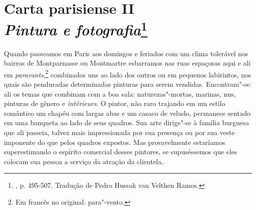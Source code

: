 \chapter{Carta parisiense II\\
\emph{Pintura e fotografia}\footnote[*]{
  , p. 495-507. Tradução de Pedro Hussak van Velthen Ramos.}}


Quando passeamos em Paris aos domingos e feriados com um clima tolerável
nos bairros de Montparnasse ou Montmartre esbarramos nas ruas espaçosas
aqui e ali em \emph{paravants},\footnote{Em francês no original:
 para"-vento. \versal{[N. T.]}} combinados uns ao lado dos outros ou em pequenos
labirintos, nos quais são penduradas determinadas pinturas para serem
vendidas. Encontram"-se ali os temas que combinam com a boa sala:
naturezas"-mortas, marinas, nus, pinturas de gênero e \emph{intérieurs}.
O pintor, não raro trajando em um estilo romântico um chapéu com largas abas e
um casaco de veludo, permanece sentado em uma banqueta ao lado de seus
quadros. Sua arte dirige"-se à família burguesa que ali passeia,
talvez mais impressionada por sua presença ou por sua veste
imponente do que pelos quadros expostos. Mas provavelmente estaríamos
superestimando o espírito comercial desses pintores, se supuséssemos que
eles colocam sua pessoa a serviço da atração da clientela.

